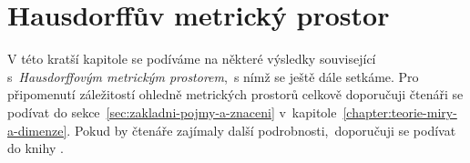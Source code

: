 \chapter{Hausdorffův metrický prostor}\label{chapter:hausdorffuv-mp}

V této kratší kapitole se podíváme na některé výsledky související s~\emph{Hausdorffovým metrickým prostorem},~s nímž se ještě dále setkáme. Pro připomenutí záležitostí ohledně metrických prostorů celkově doporučuji čtenáři se podívat do sekce~\ref{sec:zakladni-pojmy-a-znaceni} v~kapitole~\ref{chapter:teorie-miry-a-dimenze}. Pokud by čtenáře zajímaly další podrobnosti,~doporučuji se podívat do knihy \citep[str. 71]{Edgar2008}.


